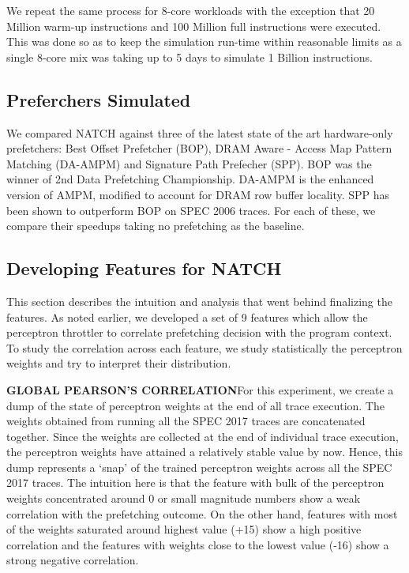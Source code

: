 We repeat the same process for 8-core workloads with the exception
that 20 Million warm-up instructions and 100 Million full instructions
were executed.  This was done so as to keep the simulation run-time
within reasonable limits as a single 8-core mix was taking up to 5
days to simulate 1 Billion instructions.

\subsection{Preferchers Simulated}
\label{Method-Prefetchers}
We compared NATCH against three of the latest state of the art
hardware-only prefetchers: Best Offset Prefetcher (BOP), DRAM Aware - Access Map
Pattern Matching (DA-AMPM)\cite{DA_AMPM} and Signature Path Prefecher
(SPP).  BOP was the winner of 2nd Data Prefetching Championship.
DA-AMPM is the enhanced version of AMPM, modified to account for DRAM
row buffer locality.  SPP has been shown to outperform BOP on SPEC
2006 traces.  For each of these, we compare their speedups taking no
prefetching as the baseline.


\subsection{Developing Features for NATCH}
\label{Method-Features}
This section describes the intuition and analysis that went behind
finalizing the features.  As noted earlier, we developed a set of 9
features which allow the perceptron throttler to correlate prefetching
decision with the program context.  To study the correlation across
each feature, we study statistically the perceptron weights and try to
interpret their distribution.

\textbf{GLOBAL PEARSON'S CORRELATION}\newline For this experiment, we
create a dump of the state of perceptron weights at the end of all
trace execution.  The weights obtained from running all the SPEC 2017
traces are concatenated together.  Since the weights are collected at
the end of individual trace execution, the perceptron weights have
attained a relatively stable value by now.  Hence, this dump
represents a `snap' of the trained perceptron weights across all the
SPEC 2017 traces.  The intuition here is that the feature with bulk of
the perceptron weights concentrated around 0 or small magnitude
numbers show a weak correlation with the prefetching outcome.  On the
other hand, features with most of the weights saturated around highest
value (+15) show a high positive correlation and the features with
weights close to the lowest value (-16) show a strong negative
correlation.

